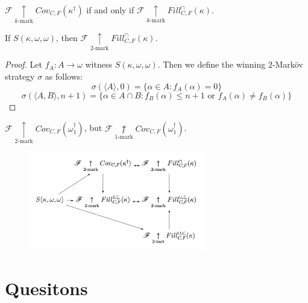 \documentclass{beamer}
\theoremstyle{definition}
\newcommand{\kmarkwin}[1]{\underset{#1\text{-mark}}{\uparrow}}
\newcommand{\notkmarkwin}[1]{\underset{#1\text{-mark}}{\not\uparrow}}
\newcommand{\oneptlind}[1]{#1^\dagger}
\newcommand{\mengame}[1]{Cov_{C,F}(#1)}
\newcommand{\fillgameInt}[1]{Fill^{\cap}_{C,F}(#1)}
\newcommand{\<}{\langle}
\renewcommand{\>}{\rangle}
\newcommand{\alcompS}[1]{S(#1,\omega,\omega)}
\newcommand{\pl}[1]{\mathscr{#1}}
\begin{document}
\begin{frame}
  \begin{theorem}
    $\pl F \kmarkwin{k} \mengame{\oneptlind\kappa}$ if and only if
    $\pl F \kmarkwin{k} \fillgameInt\kappa$.
  \end{theorem}

  \pause

  \begin{theorem}
    If $\alcompS\kappa$, then $\pl F\kmarkwin{2} \fillgameInt\kappa$.
  \end{theorem}

  \pause

  \begin{proof}
    Let $f_A:A\to\omega$ witness $\alcompS\kappa$. Then we define the
    winning $2$-Mark\"ov strategy $\sigma$ as follows:
      \[
        \sigma(\<A\>,0) = \{\alpha\in A: f_A(\alpha) = 0\}
      \]
      \[
        \sigma(\<A,B\>,n+1)
          =
        \{\alpha\in A\cap B
          :
        f_B(\alpha) \leq n+1
          \text{ or }
        f_A(\alpha)\not=f_B(\alpha)\}
      \]
  \end{proof}
\end{frame}

\begin{frame}
  \begin{corollary}
    $\pl F\kmarkwin{2}\mengame{\oneptlind\omega_1}$, but
    $\pl F\notkmarkwin1\mengame{\oneptlind\omega_1}$.
  \end{corollary}
  \begin{figure}
    \includegraphics[height=1.7in]{mengerGameChart.png}
  \end{figure}
\end{frame}

\section{Quesitons}
\end{document}
